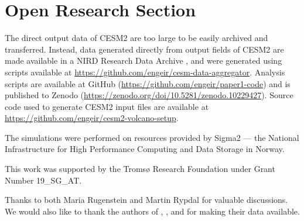 \documentclass[draft]{agujournal2019}
\begin{document}
%
%

\section*{Open Research Section}


The direct output data of CESM2 are too large to be easily archived and transferred.
Instead, data generated directly from output fields of CESM2 are made available in a
NIRD Research Data Archive \cite{enger2024}, and were generated using scripts available
at \url{https://github.com/engeir/cesm-data-aggregator}. Analysis scripts are available
at GitHub (\url{https://github.com/engeir/paper1-code}) and is published to Zenodo
(\url{https://zenodo.org/doi/10.5281/zenodo.10229427}). Source code used to generate
CESM2 input files are available at \url{https://github.com/engeir/cesm2-volcano-setup}.







\acknowledgments


The simulations were performed on resources provided by Sigma2 --- the National
Infrastructure for High Performance Computing and Data Storage in Norway.

This work was supported by the Tromsø Research Foundation under Grant Number 19\_SG\_AT.

Thanks to both Maria Rugenstein and Martin Rypdal for valuable discussions. We would
also like to thank the authors of , , and
 for making their data available.
\end{document}
